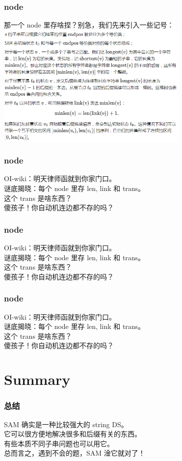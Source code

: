 \documentclass{beamer}
\begin{document}
    \begin{frame}
        \frametitle{node}
        那一个 node 里存啥捏？别急，我们先来引入一些记号：\\
        \includegraphics[height=6cm]{g6.png}
    \end{frame}

    \begin{frame}
        \frametitle{node}
        OI-wiki：明天律师函就到你家门口。\\
        谜底揭晓：每个 node 里存 len, link 和 trans。\\
        这个 trans 是啥东西？\\ 
        傻孩子！你自动机连边都不存的吗？
    \end{frame}

    \begin{frame}
        \frametitle{node}
        OI-wiki：明天律师函就到你家门口。\\
        谜底揭晓：每个 node 里存 len, link 和 trans。\\
        这个 trans 是啥东西？\\ 
        傻孩子！你自动机连边都不存的吗？
    \end{frame}

    \begin{frame}
        \frametitle{node}
        OI-wiki：明天律师函就到你家门口。\\
        谜底揭晓：每个 node 里存 len, link 和 trans。\\
        这个 trans 是啥东西？\\ 
        傻孩子！你自动机连边都不存的吗？
    \end{frame}

    \section*{Summary}

    \begin{frame}
        \frametitle{总结}
        SAM 确实是一种比较强大的 string DS。  \\
        它可以很方便地解决很多和后缀有关的东西。\\
        有些本质不同子串问题也可以用它。\\
        总而言之，遇到不会的题，SAM 淦它就对了！
    \end{frame}
\end{document}
